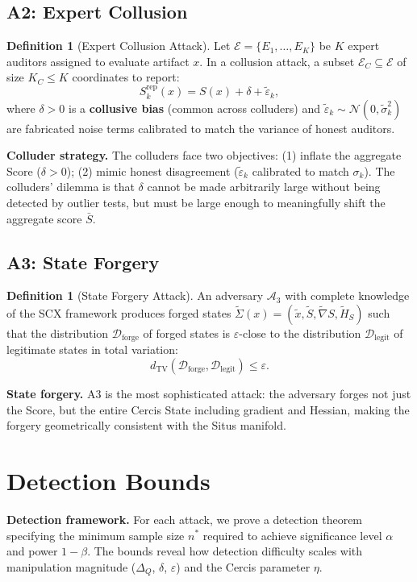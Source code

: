 \documentclass[11pt,a4paper]{article}
\theoremstyle{plain}
\theoremstyle{definition}
\newtheorem{definition}[theorem]{Definition}
\theoremstyle{remark}
\newcommand{\cA}{\mathcal{A}}
\newcommand{\cD}{\mathcal{D}}
\newcommand{\cE}{\mathcal{E}}
\newcommand{\cN}{\mathcal{N}}
\begin{document}
\subsection{A2: Expert Collusion}
\begin{definition}[Expert Collusion Attack]\label{def:a2}
  Let \(\cE = \{E_1, \dots, E_K\}\) be \(K\) expert auditors assigned to evaluate artifact
  \(x\). In a collusion attack, a subset \(\cE_C \subseteq \cE\) of size \(K_C \leq K\)
  coordinates to report:
  \[ S_k^{\text{rep}}(x) = S(x) + \delta + \tilde{\varepsilon}_k, \]
  where \(\delta > 0\) is a \textbf{collusive bias} (common across colluders) and
  \(\tilde{\varepsilon}_k \sim \cN(0, \tilde{\sigma}_k^2)\) are fabricated noise terms
  calibrated to match the variance of honest auditors.
\end{definition}

\noindent
\textbf{Colluder strategy.} The colluders face two objectives: (1) inflate the aggregate Score (\(\delta > 0\)); (2) mimic honest disagreement (\(\tilde{\varepsilon}_k\) calibrated to match \(\sigma_k\)). The colluders' dilemma is that \(\delta\) cannot be made arbitrarily large without being detected by outlier tests, but must be large enough to meaningfully shift the aggregate score \(\bar{S}\).

\subsection{A3: State Forgery}
\begin{definition}[State Forgery Attack]\label{def:a3}
  An adversary \(\cA_3\) with complete knowledge of the SCX framework produces forged states \(\tilde{\Sigma}(x) =
  (\tilde{x}, \tilde{S}, \tilde{\nabla}S, \tilde{H}_S)\) such that the distribution
  \(\cD_{\text{forge}}\) of forged states is \(\varepsilon\)-close to the distribution
  \(\cD_{\text{legit}}\) of legitimate states in total variation:
  \[ d_{\text{TV}}(\cD_{\text{forge}}, \cD_{\text{legit}}) \leq \varepsilon. \]
\end{definition}

\noindent
\textbf{State forgery.} A3 is the most sophisticated attack: the adversary forges not just the Score, but the entire Cercis State including gradient and Hessian, making the forgery geometrically consistent with the Situs manifold.

\section{Detection Bounds}
\label{sec:bounds}
\noindent
\textbf{Detection framework.} For each attack, we prove a detection theorem specifying the minimum sample size \(n^*\) required to achieve significance level \(\alpha\) and power \(1-\beta\). The bounds reveal how detection difficulty scales with manipulation magnitude (\(\Delta_Q\), \(\delta\), \(\varepsilon\)) and the Cercis parameter \(\eta\).
\end{document}
